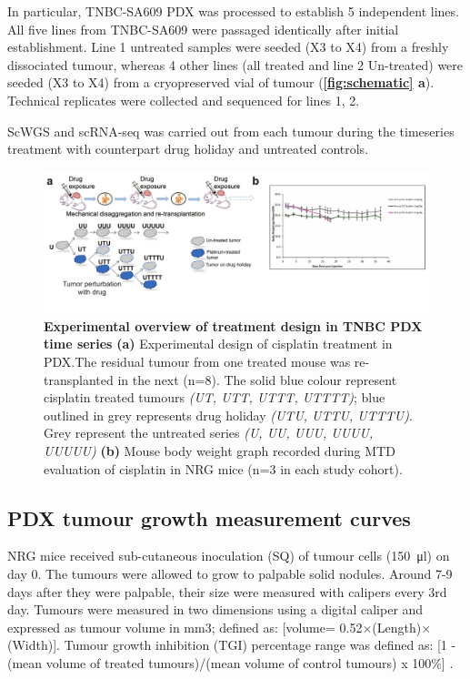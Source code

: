 In particular, TNBC-SA609 PDX was processed to establish 5 independent lines. All five lines from TNBC-SA609 were passaged identically after initial establishment. Line 1 untreated samples were seeded (X3 to X4) from a freshly dissociated tumour, whereas 4 other lines (all treated and line 2 Un-treated) were seeded (X3 to X4) from a cryopreserved vial of tumour (\textbf{\autoref{fig:schematic} a}). Technical replicates were collected and sequenced for lines 1, 2. 

ScWGS and scRNA-seq was carried out from each tumour during the timeseries treatment with counterpart drug holiday and untreated controls.

\begin{figure}
\centering
\includegraphics[width=\textwidth]{Figures/chap2/treatmentdesignMTD.pdf}
	
\caption[Experimental overview of TNBC PDX treated time series]
	{\small
	\textbf{Experimental overview of treatment design in TNBC PDX time series}
\textbf{(a)} Experimental design of cisplatin treatment in PDX.The residual tumour from one treated mouse was re-transplanted in the next (n=8). The solid blue colour represent cisplatin treated tumours \textit{(UT, UTT, UTTT, UTTTT)}; blue outlined in grey represents drug holiday \textit{(UTU, UTTU, UTTTU)}. Grey represent the untreated series \textit{(U, UU, UUU, UUUU, UUUUU)} \textbf{(b)} Mouse body weight graph recorded during \ac{MTD} evaluation of cisplatin in NRG mice (n=3 in each study cohort).}
	
	\label{fig:treatmentdesignMTD}
\end{figure}

\subsection{PDX tumour growth measurement curves} 
NRG mice received sub-cutaneous inoculation (SQ) of tumour cells (\SI{150}{\ul}) on day 0. 
The tumours were allowed to grow to palpable solid nodules.
Around 7-9 days after they were palpable, their size were measured with calipers every 3rd day. 
Tumours were measured in two dimensions using a digital caliper and expressed as tumour volume in mm3; defined as: [volume= 0.52$\times$(Length)$\times$(Width)].
Tumour growth inhibition (TGI) percentage range was defined as: [1 - (mean volume of treated tumours)/(mean volume of control tumours) x 100\%] \cite{hather2014growth}.


